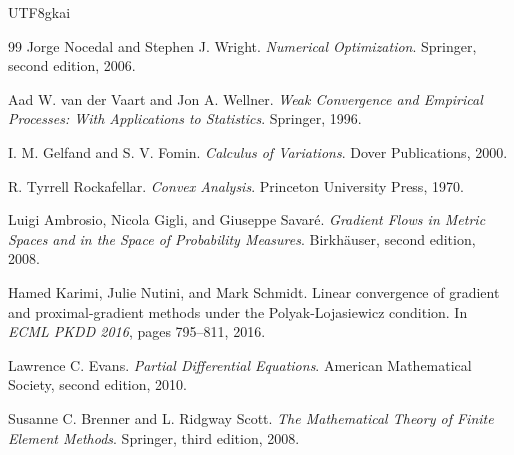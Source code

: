 \documentclass[12pt]{article}
\begin{document}
\begin{CJK*}{UTF8}{gkai}
\begin{thebibliography}{99}
Jorge Nocedal and Stephen J. Wright.
\newblock \emph{Numerical Optimization}.
\newblock Springer, second edition, 2006.

Aad W. van der Vaart and Jon A. Wellner.
\newblock \emph{Weak Convergence and Empirical Processes: With Applications to Statistics}.
\newblock Springer, 1996.

I. M. Gelfand and S. V. Fomin.
\newblock \emph{Calculus of Variations}.
\newblock Dover Publications, 2000.

R. Tyrrell Rockafellar.
\newblock \emph{Convex Analysis}.
\newblock Princeton University Press, 1970.

Luigi Ambrosio, Nicola Gigli, and Giuseppe Savar\'e.
\newblock \emph{Gradient Flows in Metric Spaces and in the Space of Probability Measures}.
\newblock Birkh\"auser, second edition, 2008.

Hamed Karimi, Julie Nutini, and Mark Schmidt.
\newblock Linear convergence of gradient and proximal-gradient methods under the Polyak-Lojasiewicz condition.
\newblock In \emph{ECML PKDD 2016}, pages 795--811, 2016.

Lawrence C. Evans.
\newblock \emph{Partial Differential Equations}.
\newblock American Mathematical Society, second edition, 2010.

Susanne C. Brenner and L. Ridgway Scott.
\newblock \emph{The Mathematical Theory of Finite Element Methods}.
\newblock Springer, third edition, 2008.

\end{thebibliography}

\end{CJK*}
\end{document}
